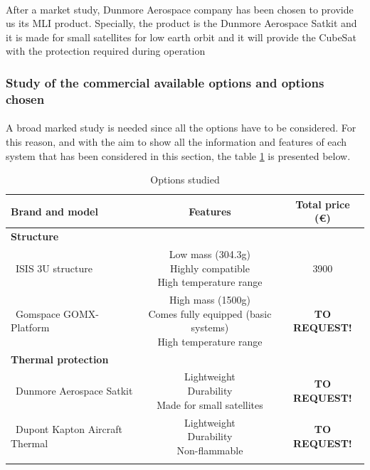 \paragraph{} 
After a market study, Dunmore Aerospace company has been chosen to provide us its MLI product. Specially, the product is the Dunmore Aerospace Satkit and it is made for small satellites for low earth orbit and it will provide the CubeSat with the protection required during operation

\subsubsection{Study of the commercial available options and options chosen}
\paragraph{}A broad marked study is needed since all the options have to be considered. For this reason, and with the aim to show all the information and features of each system that has been considered in this section, the table \ref{structureoptions} is presented below.


\begin{longtable}{| l | c | c | }
\hline
\rowcolor[gray]{0.80}	\textbf{Brand and model} &  \textbf{Features}     & \textbf{Total price (\euro)}   \\
\hline
\endfirsthead

\rowcolor[gray]{0.85} \textbf{Structure} &  &  \\
	   ~ISIS 3U structure & \makecell{Low mass (304.3g) \\ Highly compatible \\ High temperature range} & 3900 \\
	   \hline
	   ~Gomspace GOMX-Platform & \makecell{High mass (1500g) \\ Comes fully equipped (basic systems) \\ High temperature range} & \textbf{TO REQUEST!} \\
	   \hline
\rowcolor[gray]{0.85} \textbf{Thermal protection} &  &  \\
	   ~Dunmore Aerospace Satkit & \makecell{Lightweight \\ Durability \\ Made for small satellites}& \textbf{TO REQUEST!} \\
	   \hline
	   ~Dupont Kapton Aircraft Thermal & \makecell{Lightweight \\ Durability \\ Non-flammable} & \textbf{TO REQUEST!} \\
	\hline

\caption{Options studied}
\label{structureoptions}
\end{longtable}

